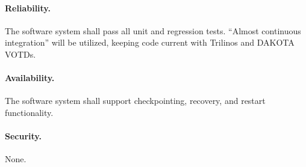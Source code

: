 \documentclass[10pt]{article}
\theoremstyle{plain}
\theoremstyle{definition}
\begin{document}
\paragraph{Reliability.} The software system shall pass all unit and regression tests. ``Almost continuous integration'' will be utilized, keeping code current with Trilinos and DAKOTA VOTDs.

\paragraph{Availability.} The software system shall support checkpointing, recovery, and restart functionality.

\paragraph{Security.} None.
\end{document}
